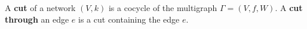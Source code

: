 A \textbf{cut} of a network $(V, k)$ is a cocycle of the multigraph $\Gamma = (V, f, W)$. A \textbf{cut through} an edge $e$ is a cut containing the edge $e$.
